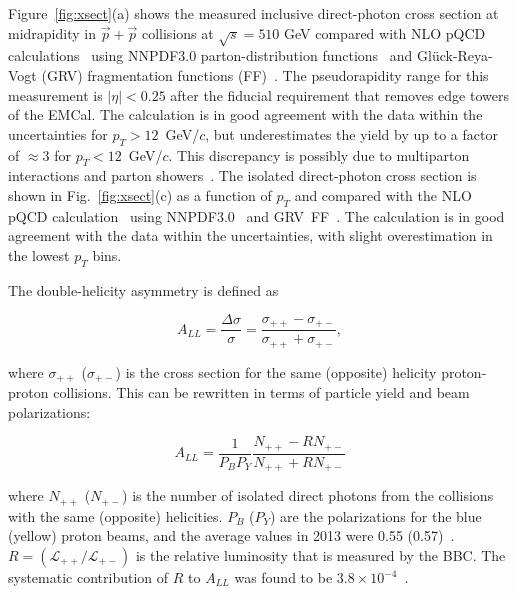 \documentclass[twocolumn,letterpaper,aps,prl,longbibliography,superscriptaddress,floatfix]{revtex4-2}
\newcommand{\pT}{\mbox{$p_T$}\xspace}
\begin{document}
Figure~\ref{fig:xsect}(a) shows the measured inclusive direct-photon 
cross section at midrapidity in $\vec{p}+\vec{p}$ collisions at 
$\sqrt{s}=510$ GeV compared with NLO pQCD 
calculations~\cite{PhysRevD.48.3136,PhysRevD.50.1901} using NNPDF3.0 
parton-distribution functions~\cite{Ball2015,Bonvini2015} and 
Gl{\"u}ck-Reya-Vogt (GRV) fragmentation functions 
(FF)~\cite{PhysRevD.45.3986}. The pseudorapidity range for this 
measurement is $|\eta|<0.25$ after the fiducial requirement that removes 
edge towers of the EMCal. The calculation is in good agreement with the 
data within the uncertainties for $p_T>12$~GeV/$c$, but underestimates 
the yield by up to a factor of $\approx$3 for \mbox{$p_T<12$ GeV/$c$}. 
This discrepancy is possibly due to multiparton interactions and parton 
showers~\cite{Nason_2004,Frixione_2007,Alioli2010,Jezo2016,Klasen2018}. 
The isolated direct-photon cross section is shown in 
Fig.~\ref{fig:xsect}(c) as a function of \pT and compared with the NLO 
pQCD calculation~\cite{PhysRevD.48.3136,PhysRevD.50.1901} using 
NNPDF3.0~\cite{Ball2015,Bonvini2015} and 
GRV~FF~\cite{PhysRevD.45.3986}. The calculation is in good agreement with 
the data within the uncertainties, with slight overestimation in the 
lowest \pT bins.



The double-helicity asymmetry is defined as

\begin{equation} \label{eq:all}
A_{LL} = \frac{\Delta\sigma}{\sigma} = \frac{\sigma_{++}-\sigma_{+-}}{\sigma_{++}+\sigma_{+-}},
\end{equation}

where $\sigma_{++}$ ($\sigma_{+-}$) is the cross section for the same 
(opposite) helicity proton-proton collisions. This can be rewritten in 
terms of particle yield and beam polarizations:

\begin{equation}
A_{LL} = \frac{1}{P_BP_Y} \frac{N_{++}-RN_{+-}}{N_{++}+RN_{+-}}
\end{equation}

where $N_{++}$ ($N_{+-}$) is the number of isolated direct photons from 
the collisions with the same (opposite) helicities. $P_{B}$ ($P_{Y}$) 
are the polarizations for the blue (yellow) proton beams, and the 
average values in 2013 were 0.55 (0.57)~\cite{POBLAGUEV2020164261}. $R 
=(\mathcal{L_{++}}/\mathcal{L_{+-}})$ is the relative luminosity that is 
measured by the BBC. The systematic contribution of $R$ to $A_{LL}$ was 
found to be $3.8{\times}10^{-4}$~\cite{PhysRevD.93.011501}.
\end{document}
